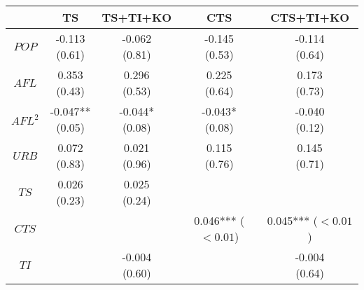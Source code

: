 \begin{tabular}{ccccc}
\toprule
                                               &                                TS &                          TS+TI+KO &                               CTS &                         CTS+TI+KO \\
\midrule
                                         $POP$ &         \makecell{-0.113\\(0.61)} &         \makecell{-0.062\\(0.81)} &         \makecell{-0.145\\(0.53)} &         \makecell{-0.114\\(0.64)} \\
                                         $AFL$ &          \makecell{0.353\\(0.43)} &          \makecell{0.296\\(0.53)} &          \makecell{0.225\\(0.64)} &          \makecell{0.173\\(0.73)} \\
                                       $AFL^2$ &       \makecell{-0.047**\\(0.05)} &        \makecell{-0.044*\\(0.08)} &        \makecell{-0.043*\\(0.08)} &         \makecell{-0.040\\(0.12)} \\
                                         $URB$ &          \makecell{0.072\\(0.83)} &          \makecell{0.021\\(0.96)} &          \makecell{0.115\\(0.76)} &          \makecell{0.145\\(0.71)} \\
                                          $TS$ &          \makecell{0.026\\(0.23)} &          \makecell{0.025\\(0.24)} &                                   &                                   \\
                                         $CTS$ &                                   &                                   &   \makecell{0.046***\\($< 0.01$)} &   \makecell{0.045***\\($< 0.01$)} \\
                                          $TI$ &                                   &         \makecell{-0.004\\(0.60)} &                                   &         \makecell{-0.004\\(0.64)} \\

\end{tabular}
